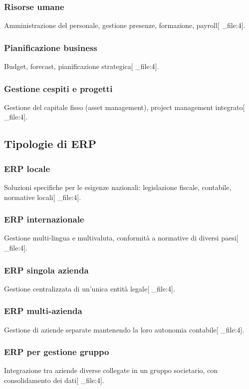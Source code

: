 \documentclass[12pt,a4paper]{article}
\begin{document}
\subsubsection{Risorse umane}
Amministrazione del personale, gestione presenze, formazione, payroll[ _file:4].

\subsubsection{Pianificazione business}
Budget, forecast, pianificazione strategica[ _file:4].

\subsubsection{Gestione cespiti e progetti}
Gestione del capitale fisso (asset management), project management integrato[ _file:4].

\subsection{Tipologie di ERP}

\subsubsection{ERP locale}
Soluzioni specifiche per le esigenze nazionali: legislazione fiscale, contabile, normative locali[ _file:4].

\subsubsection{ERP internazionale}
Gestione multi-lingua e multivaluta, conformità a normative di diversi paesi[ _file:4].

\subsubsection{ERP singola azienda}
Gestione centralizzata di un'unica entità legale[ _file:4].

\subsubsection{ERP multi-azienda}
Gestione di aziende separate mantenendo la loro autonomia contabile[ _file:4].

\subsubsection{ERP per gestione gruppo}
Integrazione tra aziende diverse collegate in un gruppo societario, con consolidamento dei dati[ _file:4].
\end{document}
